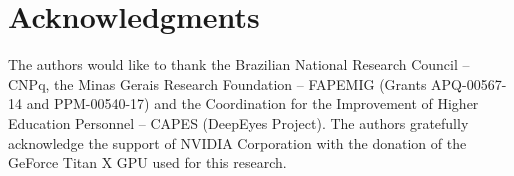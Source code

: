 \documentclass[10pt,conference]{IEEEtran}
\begin{document}
%
\section*{Acknowledgments}

The authors would like to thank the Brazilian National Research Council -- CNPq, the Minas Gerais Research Foundation -- FAPEMIG (Grants APQ-00567-14 and PPM-00540-17) and the Coordination for the Improvement of Higher Education Personnel -- CAPES (DeepEyes Project). The authors gratefully acknowledge the support of NVIDIA Corporation with the donation of the GeForce Titan X GPU used for this research.


\balance


\end{document}
